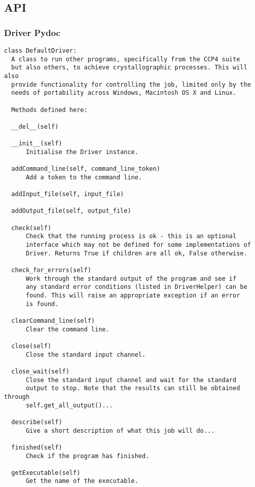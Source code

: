 \documentclass[a4paper, 11pt]{article}
\begin{document}
\subsection{API}

\subsubsection{Driver Pydoc}

{
\tiny
\begin{verbatim}
class DefaultDriver:
  A class to run other programs, specifically from the CCP4 suite
  but also others, to achieve crystallographic processes. This will also
  provide functionality for controlling the job, limited only by the
  needs of portability across Windows, Macintosh OS X and Linux.
  
  Methods defined here:
  
  __del__(self)
  
  __init__(self)
      Initialise the Driver instance.
  
  addCommand_line(self, command_line_token)
      Add a token to the command line.
  
  addInput_file(self, input_file)
  
  addOutput_file(self, output_file)
  
  check(self)
      Check that the running process is ok - this is an optional
      interface which may not be defined for some implementations of
      Driver. Returns True if children are all ok, False otherwise.
  
  check_for_errors(self)
      Work through the standard output of the program and see if
      any standard error conditions (listed in DriverHelper) can be
      found. This will raise an appropriate exception if an error
      is found.
  
  clearCommand_line(self)
      Clear the command line.
  
  close(self)
      Close the standard input channel.
  
  close_wait(self)
      Close the standard input channel and wait for the standard
      output to stop. Note that the results can still be obtained through
      self.get_all_output()...
  
  describe(self)
      Give a short description of what this job will do...
  
  finished(self)
      Check if the program has finished.
  
  getExecutable(self)
      Get the name of the executable.
  

\end{verbatim}}
\end{document}
